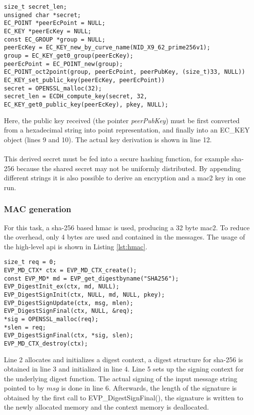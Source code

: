\begin{lstlisting}[style=cStyle,caption={Deriving a shared secret},label=lst:derive]
size_t secret_len;
unsigned char *secret;
EC_POINT *peerEcPoint = NULL;
EC_KEY *peerEcKey = NULL;
const EC_GROUP *group = NULL;
peerEcKey = EC_KEY_new_by_curve_name(NID_X9_62_prime256v1);       
group = EC_KEY_get0_group(peerEcKey);
peerEcPoint = EC_POINT_new(group);
EC_POINT_oct2point(group, peerEcPoint, peerPubKey, (size_t)33, NULL))
EC_KEY_set_public_key(peerEcKey, peerEcPoint))
secret = OPENSSL_malloc(32);
secret_len = ECDH_compute_key(secret, 32, EC_KEY_get0_public_key(peerEcKey), pkey, NULL);
\end{lstlisting}
Here, the public key received (the pointer \textit{peerPubKey}) must be first converted from a hexadecimal string into point representation, and finally into an EC\_KEY object
(lines 9 and 10). The actual key derivation is shown in line 12.
\\
\\
This derived secret must be fed into a secure hashing function, for example \gls{sha}-256 because the shared secret may not be uniformly distributed. By appending different strings
it is also possible to derive an encryption and a \gls{mac2} key in one run.

\subsubsection{MAC generation}
For this task, a \gls{sha}-256 based \gls{hmac} is used, producing a 32 byte \gls{mac2}. To reduce the overhead, only 4 bytes are used and contained in the messages. The usage of
the high-level \gls{api} is shown in Listing \ref{lst:hmac}.
\begin{lstlisting}[style=cStyle,caption={Generating an \gls{hmac}},label=lst:hmac]
size_t req = 0;
EVP_MD_CTX* ctx = EVP_MD_CTX_create();
const EVP_MD* md = EVP_get_digestbyname("SHA256");
EVP_DigestInit_ex(ctx, md, NULL);
EVP_DigestSignInit(ctx, NULL, md, NULL, pkey);
EVP_DigestSignUpdate(ctx, msg, mlen);
EVP_DigestSignFinal(ctx, NULL, &req);
*sig = OPENSSL_malloc(req);
*slen = req;
EVP_DigestSignFinal(ctx, *sig, slen);
EVP_MD_CTX_destroy(ctx);
\end{lstlisting}
Line 2 allocates and initializes a digest context, a digest structure for \gls{sha}-256 is obtained in line 3 and initialized in line 4. Line 5 sets up the signing context for the
underlying digest function. The actual signing of the input message string pointed to by $msg$ is done in line 6. Afterwards, the length of the signature is obtained by the first call
to EVP\_DigestSignFinal(), the signature is written to the newly allocated memory and the context memory is deallocated.

